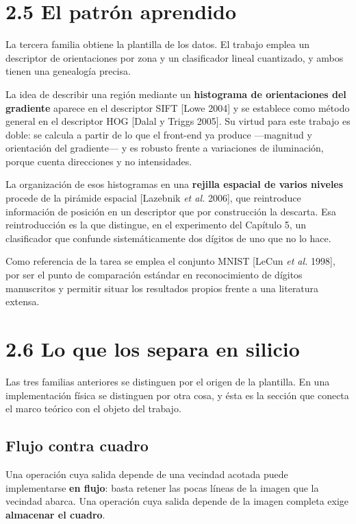 \section{2.5 El patrón aprendido}\label{el-patruxf3n-aprendido}

La tercera familia obtiene la plantilla de los datos. El trabajo emplea
un descriptor de orientaciones por zona y un clasificador lineal
cuantizado, y ambos tienen una genealogía precisa.

La idea de describir una región mediante un \textbf{histograma de
orientaciones del gradiente} aparece en el descriptor SIFT {[}Lowe
2004{]} y se establece como método general en el descriptor HOG {[}Dalal
y Triggs 2005{]}. Su virtud para este trabajo es doble: se calcula a
partir de lo que el front-end ya produce ---magnitud y orientación del
gradiente--- y es robusto frente a variaciones de iluminación, porque
cuenta direcciones y no intensidades.

La organización de esos histogramas en una \textbf{rejilla espacial de
varios niveles} procede de la pirámide espacial {[}Lazebnik \emph{et
al.} 2006{]}, que reintroduce información de posición en un descriptor
que por construcción la descarta. Esa reintroducción es la que
distingue, en el experimento del Capítulo 5, un clasificador que
confunde sistemáticamente dos dígitos de uno que no lo hace.

Como referencia de la tarea se emplea el conjunto MNIST {[}LeCun
\emph{et al.} 1998{]}, por ser el punto de comparación estándar en
reconocimiento de dígitos manuscritos y permitir situar los resultados
propios frente a una literatura extensa.

\section{2.6 Lo que los separa en
silicio}\label{lo-que-los-separa-en-silicio}

Las tres familias anteriores se distinguen por el origen de la
plantilla. En una implementación física se distinguen por otra cosa, y
ésta es la sección que conecta el marco teórico con el objeto del
trabajo.

\subsection{Flujo contra cuadro}\label{flujo-contra-cuadro}

Una operación cuya salida depende de una vecindad acotada puede
implementarse \textbf{en flujo}: basta retener las pocas líneas de la
imagen que la vecindad abarca. Una operación cuya salida depende de la
imagen completa exige \textbf{almacenar el cuadro}.

